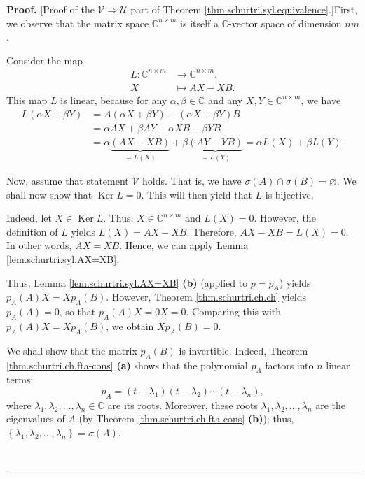 \documentclass[numbers=enddot,12pt,final,onecolumn,notitlepage]{scrartcl}%
\numberwithin{exer}{subsection}
\theoremstyle{definition}
\newenvironment{proof}[1][Proof]{\noindent\textbf{#1.} }{\ \rule{0.5em}{0.5em}}
\begin{document}
\begin{proof}
[Proof of the $\mathcal{V}\Longrightarrow\mathcal{U}$ part of Theorem
\ref{thm.schurtri.syl.equivalence}.]First, we observe that the matrix space
$\mathbb{C}^{n\times m}$ is itself a $\mathbb{C}$-vector space of dimension
$nm$.

Consider the map%
\begin{align*}
L:\mathbb{C}^{n\times m}  &  \rightarrow\mathbb{C}^{n\times m},\\
X  &  \mapsto AX-XB.
\end{align*}
This map $L$ is linear, because for any $\alpha,\beta\in\mathbb{C}$ and any
$X,Y\in\mathbb{C}^{n\times m}$, we have%
\begin{align*}
L\left(  \alpha X+\beta Y\right)   &  =A\left(  \alpha X+\beta Y\right)
-\left(  \alpha X+\beta Y\right)  B\\
&  =\alpha AX+\beta AY-\alpha XB-\beta YB\\
&  =\alpha\underbrace{\left(  AX-XB\right)  }_{=L\left(  X\right)  }%
+\beta\underbrace{\left(  AY-YB\right)  }_{=L\left(  Y\right)  }=\alpha
L\left(  X\right)  +\beta L\left(  Y\right)  .
\end{align*}


Now, assume that statement $\mathcal{V}$ holds. That is, we have
$\sigma\left(  A\right)  \cap\sigma\left(  B\right)  =\varnothing$. We shall
now show that $\operatorname*{Ker}L=0$. This will then yield that $L$ is bijective.

Indeed, let $X\in\operatorname*{Ker}L$. Thus, $X\in\mathbb{C}^{n\times m}$ and
$L\left(  X\right)  =0$. However, the definition of $L$ yields $L\left(
X\right)  =AX-XB$. Therefore, $AX-XB=L\left(  X\right)  =0$. In other words,
$AX=XB$. Hence, we can apply Lemma \ref{lem.schurtri.syl.AX=XB}.

Thus, Lemma \ref{lem.schurtri.syl.AX=XB} \textbf{(b)} (applied to $p=p_{A}$)
yields $p_{A}\left(  A\right)  X=Xp_{A}\left(  B\right)  $. However, Theorem
\ref{thm.schurtri.ch.ch} yields $p_{A}\left(  A\right)  =0$, so that
$p_{A}\left(  A\right)  X=0X=0$. Comparing this with $p_{A}\left(  A\right)
X=Xp_{A}\left(  B\right)  $, we obtain $Xp_{A}\left(  B\right)  =0$.

We shall show that the matrix $p_{A}\left(  B\right)  $ is invertible. Indeed,
Theorem \ref{thm.schurtri.ch.fta-cons} \textbf{(a)} shows that the polynomial
$p_{A}$ factors into $n$ linear terms:%
\begin{equation}
p_{A}=\left(  t-\lambda_{1}\right)  \left(  t-\lambda_{2}\right)
\cdots\left(  t-\lambda_{n}\right)  ,
\label{pf.thm.schurtri.syl.equivalence.pA=prod}%
\end{equation}
where $\lambda_{1},\lambda_{2},\ldots,\lambda_{n}\in\mathbb{C}$ are its roots.
Moreover, these roots $\lambda_{1},\lambda_{2},\ldots,\lambda_{n}$ are the
eigenvalues of $A$ (by Theorem \ref{thm.schurtri.ch.fta-cons} \textbf{(b)});
thus, $\left\{  \lambda_{1},\lambda_{2},\ldots,\lambda_{n}\right\}
=\sigma\left(  A\right)  $.


\end{proof}
\end{document}
